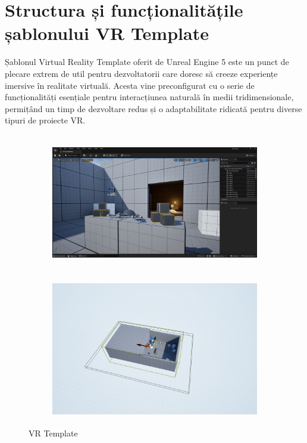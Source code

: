 \begin{itemize}
\end{itemize}

\section{Structura și funcționalitățile șablonului VR Template}

Șablonul Virtual Reality Template oferit de Unreal Engine 5 este un punct de plecare extrem de util pentru dezvoltatorii care doresc să creeze experiențe imersive în realitate virtuală. Acesta vine preconfigurat cu o serie de funcționalități esențiale pentru interacțiunea naturală în medii tridimensionale, permițând un timp de dezvoltare redus și o adaptabilitate ridicată pentru diverse tipuri de proiecte VR.

\begin{figure}[h!]
    \centering
    \begin{subfigure}{0.49\textwidth}
        \includegraphics[width=\linewidth, height=6cm]{continut/capitol3/figuri/VR_front.png}
        \label{fig:VR Template}
    \end{subfigure}
    \hfill
    \begin{subfigure}{0.49\textwidth}
        \includegraphics[width=\linewidth, height=6cm]{continut/capitol3/figuri/VR_up.png}
        \label{fig:VR Template}
    \end{subfigure}

    \caption{VR Template}
\end{figure}

